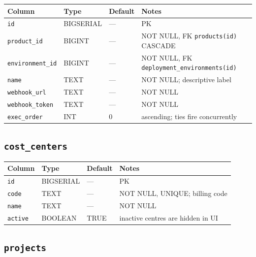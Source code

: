\documentclass[12pt,a4paper,twoside]{report}
\newcommand{\code}[1]{\texttt{#1}}
\begin{document}
\begin{table}[H]
  \centering\small
  \begin{tabular}{@{}llll@{}}
    \toprule
    \textbf{Column} & \textbf{Type} & \textbf{Default} & \textbf{Notes} \\
    \midrule
    \code{id}             & BIGSERIAL & ---       & PK \\
    \code{product\_id}    & BIGINT    & ---       & NOT NULL, FK \textrightarrow{} \code{products(id)} CASCADE \\
    \code{environment\_id}& BIGINT    & ---       & NOT NULL, FK \textrightarrow{} \code{deployment\_environments(id)} \\
    \code{name}           & TEXT      & ---       & NOT NULL; descriptive label \\
    \code{webhook\_url}   & TEXT      & ---       & NOT NULL \\
    \code{webhook\_token} & TEXT      & ---       & NOT NULL \\
    \code{exec\_order}    & INT       & 0         & ascending; ties fire concurrently \\
    \bottomrule
  \end{tabular}
\end{table}

\subsection*{\texttt{cost\_centers}}

\begin{table}[H]
  \centering\small
  \begin{tabular}{@{}llll@{}}
    \toprule
    \textbf{Column} & \textbf{Type} & \textbf{Default} & \textbf{Notes} \\
    \midrule
    \code{id}    & BIGSERIAL & ---  & PK \\
    \code{code}  & TEXT      & ---  & NOT NULL, UNIQUE; billing code \\
    \code{name}  & TEXT      & ---  & NOT NULL \\
    \code{active}& BOOLEAN   & TRUE & inactive centres are hidden in UI \\
    \bottomrule
  \end{tabular}
\end{table}

\subsection*{\texttt{projects}}
\end{document}

